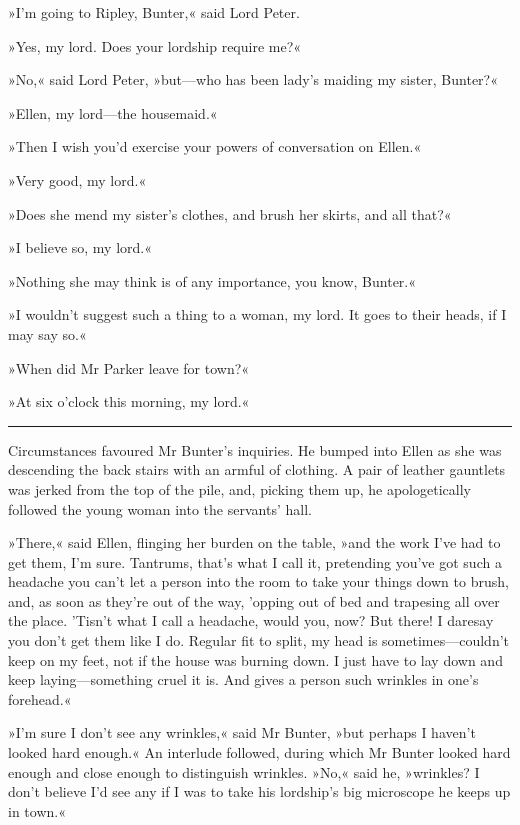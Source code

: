 »I'm going to Ripley, Bunter,« said Lord Peter.

»Yes, my lord. Does your lordship require me?«

»No,« said Lord Peter, »but\allowbreak---\allowbreak who has been lady's maiding my sister, Bunter?«

»Ellen, my lord\allowbreak---\allowbreak the housemaid.«

»Then I wish you'd exercise your powers of conversation on Ellen.«

»Very good, my lord.«

»Does she mend my sister's clothes, and brush her skirts, and all that?«

»I believe so, my lord.«

»Nothing she may think is of any importance, you know, Bunter.«

»I wouldn't suggest such a thing to a woman, my lord. It goes to their heads, if I may say so.«

»When did Mr Parker leave for town?«

»At six o'clock this morning, my lord.«

\noindent\hfil\rule{0.5\textwidth}{.4pt}\hfil

Circumstances favoured Mr Bunter's inquiries. He bumped into Ellen as she was descending the back stairs with an armful of clothing. A pair of leather gauntlets was jerked from the top of the pile, and, picking them up, he apologetically followed the young woman into the servants' hall.

»There,« said Ellen, flinging her burden on the table, »and the work I've had to get them, I'm sure. Tantrums, that's what I call it, pretending you've got such a headache you can't let a person into the room to take your things down to brush, and, as soon as they're out of the way, 'opping out of bed and trapesing all over the place.  'Tisn't what I call a headache, would you, now? But there! I daresay you don't get them like I do. Regular fit to split, my head is sometimes\allowbreak---\allowbreak couldn't keep on my feet, not if the house was burning down.  I just have to lay down and keep laying\allowbreak---\allowbreak something cruel it is. And gives a person such wrinkles in one's forehead.«

»I'm sure I don't see any wrinkles,« said Mr Bunter, »but perhaps I haven't looked hard enough.« An interlude followed, during which Mr  Bunter looked hard enough and close enough to distinguish wrinkles.  »No,« said he, »wrinkles? I don't believe I'd see any if I was to take his lordship's big microscope he keeps up in town.«

